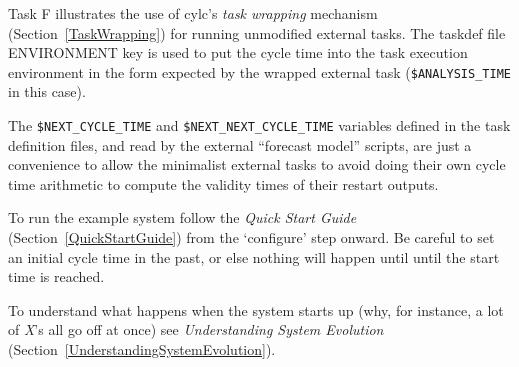Task F illustrates the use of cylc's {\em task wrapping} mechanism
(Section~\ref{TaskWrapping}) for running unmodified external tasks. 
The taskdef file ENVIRONMENT key is used to put the cycle time
into the task execution environment in the form expected by the wrapped
external task (\lstinline=$ANALYSIS_TIME= in this case). 

The \lstinline=$NEXT_CYCLE_TIME= and \lstinline=$NEXT_NEXT_CYCLE_TIME=
variables defined in the task definition files, and read by the external
``forecast model'' scripts, are just a convenience to allow the
minimalist external tasks to avoid doing their own cycle time arithmetic
to compute the validity times of their restart outputs.

To run the example system follow the {\em Quick Start Guide}
(Section~\ref{QuickStartGuide}) from the `configure' step onward. Be
careful to set an initial cycle time in the past, or else nothing will
happen until until the start time is reached.

To understand what happens when the system starts up (why, for instance,
a lot of {\em X}'s all go off at once) see {\em Understanding System Evolution}
(Section~\ref{UnderstandingSystemEvolution}).

